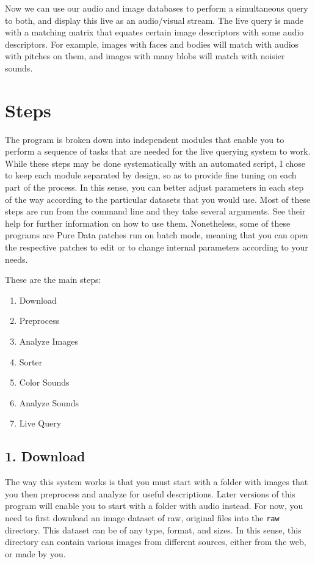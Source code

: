 Now we can use our audio and image databases to perform a simultaneous query to both, and display this live as an audio/visual stream. The live query is made with a matching matrix that equates certain image descriptors with some audio descriptors. For example, images with faces and bodies will match with audios with pitches on them, and images with many blobs will match with noisier sounds.



\section*{Steps}

The program is broken down into independent modules that enable you to perform a sequence of tasks that are needed for the live querying system to work. While these steps may be done systematically with an automated script, I chose to keep each module separated by design, so as to provide fine tuning on each part of the process. In this sense, you can better adjust parameters in each step of the way according to the particular datasets that you would use. Most of these steps are run from the command line and they take several arguments. See their help for further information on how to use them. Nonetheless, some of these programs are Pure Data patches run on batch mode, meaning that you can open the respective patches to edit or to change internal parameters according to your needs. 

These are the main steps:

\begin{enumerate}
  \singlespacing
  \item Download
  \item Preprocess
  \item Analyze Images
  \item Sorter
  \item Color Sounds
  \item Analyze Sounds
  \item Live Query
\end{enumerate}

\subsection*{1. Download}

The way this system works is that you must start with a folder with images that you then preprocess and analyze for useful descriptions. Later versions of this program will enable you to start with a folder with audio instead. For now, you need to first download an image dataset of raw, original files into the \texttt{raw} directory. This dataset can be of any type, format, and sizes. In this sense, this directory can contain various images from different sources, either from the web, or made by you.


